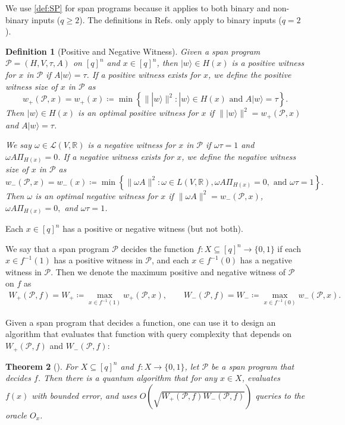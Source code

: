 \documentclass[cleveref, autoref, thm-restate,11pt]{article}
\newtheorem{theorem}{Theorem}
\newtheorem{definition}[theorem]{Definition}
\theoremstyle{definition}
\newcommand{\sop}[1]{{\mathcal #1}}
\newcommand{\ket}[1]{|#1\rangle}
\renewcommand{\wp}[2]{{w_+({#1},{#2})}}
\newcommand{\wm}[2]{{w_-({#1},{#2})}}
\newcommand{\wpo}[1]{{w_+({#1})}}
\newcommand{\wmo}[1]{{w_-({#1})}}
\newcommand{\PHx}{\Pi_{{H}(x)}}
\begin{document}
We use \cref{def:SP} for span programs because it applies to both binary and
non-binary inputs ($q\geq 2$). The definitions in Refs. \cite{belovsSpanProgramsQuantum2012,cadeTimeSpaceEfficient2018} only apply to
binary inputs ($q=2$).

\begin{definition} [Positive and Negative Witness] Given a span program $\sop P=(H,V,\tau,A)$ on
 $[q]^n$ and $x\in[q]^n$, then $\ket{w}\in H(x)$ is a positive witness for
 $x$ in $\sop P$ if $A\ket{w}=\tau$. If a positive witness exists for $x$, we
 define the positive witness size of $x$ in $\sop P$ as 
\begin{equation}
\wp{\sop P}{x}=\wpo{x}\coloneqq\min\left\{\|\ket{w}\|^2:\ket{w}\in H(x) \textrm{ and } A\ket{w}=\tau \right\}.
\end{equation}
Then $\ket{w}\in H(x)$ is an optimal positive witness for $x$ if $\|\ket{w}\|^2=\wp{\mathcal{P}}{x}$ and $A\ket{w}=\tau$.

We say $\omega\in \sop L(V,\mathbb{R})$ is a negative witness for $x$ in $\mathcal{P}$ if $\omega\tau=1$ and $\omega A \PHx=0$. If a negative witness exists for $x$, we define the negative witness size of $x$ in $\mathcal{P}$ as
\begin{equation}
 \wm{\mathcal{P}}{x}=\wmo{x}\coloneqq\min\left\{\|\omega A\|^2:
\omega\in L(V,\mathbb{R}), \omega A \PHx=0, \textrm{ and } \omega\tau=1 \right\}.
\end{equation}
Then $\omega$ is an optimal negative witness for $x$ if $\|\omega A\|^2=\wm{\mathcal{P}}{x}$, $\omega A \PHx=0,$ and $\omega\tau=1$.
\label{def:negWit}
\end{definition}
\noindent Each $x\in[q]^n$ has a positive or negative witness (but not both).

We say that a span program $\sop P$ decides the function
$f:X\subseteq[q]^n\rightarrow \{0,1\}$ if each $x\in f^{-1}(1)$ has a positive
witness in $\sop P$, and each $x\in f^{-1}(0)$ has a negative witness in $\sop P$. Then we denote the maximum positive and negative witness of $\sop P$ on $f$ as
\begin{align}
W_+(\sop P,f)=W_+\coloneqq \max_{x\in f^{-1}(1)}\wp{\sop P}{x},\qquad
W_-(\sop P,f)=W_-\coloneqq \max_{x\in f^{-1}(0)}\wm{\sop P}{x}.
\end{align}

Given a span program that decides a function, one
can use it to design an algorithm that evaluates that function with query complexity that depends on $W_+(\sop P,f)$ and $W_-(\sop P,f)$:
\begin{theorem} [\cite{reichardtSpanProgramsQuantum2009,itoApproximateSpanPrograms2019}]
For $X\subseteq[q]^n$ and $f:X\rightarrow \{0,1\}$, let $\sop P$ be a span program that decides $f$. Then there is a quantum algorithm that for any $x\in X$, evaluates $f(x)$ with bounded error, and uses $O\left(\sqrt{W_+(\sop P,f)W_-(\sop P,f)}\right)$ queries to the oracle $O_x$.
\label{thm:spEval}
\end{theorem}
\end{document}
